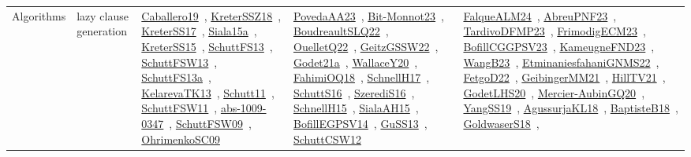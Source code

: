 {\begin{longtable}{lp{3cm}>{\raggedright\arraybackslash}p{6cm}>{\raggedright\arraybackslash}p{6cm}>{\raggedright\arraybackslash}p{8cm}}
\index{lazy clause generation}\index{Algorithms!lazy clause generation}Algorithms & lazy clause generation & \href{../works/Caballero19.pdf}{Caballero19}~\cite{Caballero19}, \href{../works/KreterSSZ18.pdf}{KreterSSZ18}~\cite{KreterSSZ18}, \href{../works/KreterSS17.pdf}{KreterSS17}~\cite{KreterSS17}, \href{../works/Siala15a.pdf}{Siala15a}~\cite{Siala15a}, \href{../works/KreterSS15.pdf}{KreterSS15}~\cite{KreterSS15}, \href{../works/SchuttFS13.pdf}{SchuttFS13}~\cite{SchuttFS13}, \href{../works/SchuttFSW13.pdf}{SchuttFSW13}~\cite{SchuttFSW13}, \href{../works/SchuttFS13a.pdf}{SchuttFS13a}~\cite{SchuttFS13a}, \href{../works/KelarevaTK13.pdf}{KelarevaTK13}~\cite{KelarevaTK13}, \href{../works/Schutt11.pdf}{Schutt11}~\cite{Schutt11}, \href{../works/SchuttFSW11.pdf}{SchuttFSW11}~\cite{SchuttFSW11}, \href{../works/abs-1009-0347.pdf}{abs-1009-0347}~\cite{abs-1009-0347}, \href{../works/SchuttFSW09.pdf}{SchuttFSW09}~\cite{SchuttFSW09}, \href{../works/OhrimenkoSC09.pdf}{OhrimenkoSC09}~\cite{OhrimenkoSC09} & \href{../works/PovedaAA23.pdf}{PovedaAA23}~\cite{PovedaAA23}, \href{../works/Bit-Monnot23.pdf}{Bit-Monnot23}~\cite{Bit-Monnot23}, \href{../works/BoudreaultSLQ22.pdf}{BoudreaultSLQ22}~\cite{BoudreaultSLQ22}, \href{../works/OuelletQ22.pdf}{OuelletQ22}~\cite{OuelletQ22}, \href{../works/GeitzGSSW22.pdf}{GeitzGSSW22}~\cite{GeitzGSSW22}, \href{../works/Godet21a.pdf}{Godet21a}~\cite{Godet21a}, \href{../works/WallaceY20.pdf}{WallaceY20}~\cite{WallaceY20}, \href{../works/FahimiOQ18.pdf}{FahimiOQ18}~\cite{FahimiOQ18}, \href{../works/SchnellH17.pdf}{SchnellH17}~\cite{SchnellH17}, \href{../works/SchuttS16.pdf}{SchuttS16}~\cite{SchuttS16}, \href{../works/SzerediS16.pdf}{SzerediS16}~\cite{SzerediS16}, \href{../works/SchnellH15.pdf}{SchnellH15}~\cite{SchnellH15}, \href{../works/SialaAH15.pdf}{SialaAH15}~\cite{SialaAH15}, \href{../works/BofillEGPSV14.pdf}{BofillEGPSV14}~\cite{BofillEGPSV14}, \href{../works/GuSS13.pdf}{GuSS13}~\cite{GuSS13}, \href{../works/SchuttCSW12.pdf}{SchuttCSW12}~\cite{SchuttCSW12} & \href{../works/FalqueALM24.pdf}{FalqueALM24}~\cite{FalqueALM24}, \href{../works/AbreuPNF23.pdf}{AbreuPNF23}~\cite{AbreuPNF23}, \href{../works/TardivoDFMP23.pdf}{TardivoDFMP23}~\cite{TardivoDFMP23}, \href{../works/FrimodigECM23.pdf}{FrimodigECM23}~\cite{FrimodigECM23}, \href{../works/BofillCGGPSV23.pdf}{BofillCGGPSV23}~\cite{BofillCGGPSV23}, \href{../works/KameugneFND23.pdf}{KameugneFND23}~\cite{KameugneFND23}, \href{../works/WangB23.pdf}{WangB23}~\cite{WangB23}, \href{../works/EtminaniesfahaniGNMS22.pdf}{EtminaniesfahaniGNMS22}~\cite{EtminaniesfahaniGNMS22}, \href{../works/FetgoD22.pdf}{FetgoD22}~\cite{FetgoD22}, \href{../works/GeibingerMM21.pdf}{GeibingerMM21}~\cite{GeibingerMM21}, \href{../works/HillTV21.pdf}{HillTV21}~\cite{HillTV21}, \href{../works/GodetLHS20.pdf}{GodetLHS20}~\cite{GodetLHS20}, \href{../works/Mercier-AubinGQ20.pdf}{Mercier-AubinGQ20}~\cite{Mercier-AubinGQ20}, \href{../works/YangSS19.pdf}{YangSS19}~\cite{YangSS19}, \href{../works/AgussurjaKL18.pdf}{AgussurjaKL18}~\cite{AgussurjaKL18}, \href{../works/BaptisteB18.pdf}{BaptisteB18}~\cite{BaptisteB18}, \href{../works/GoldwaserS18.pdf}{GoldwaserS18}~\cite{GoldwaserS18}, 
\end{longtable}}

